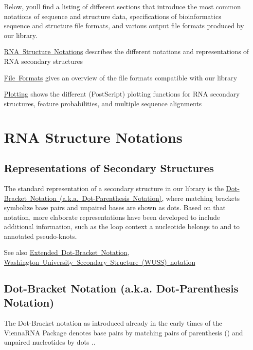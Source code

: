 Below, you\textquotesingle{}ll find a listing of different sections that introduce the most common notations of sequence and structure data, specifications of bioinformatics sequence and structure file formats, and various output file formats produced by our library.


\begin{DoxyItemize}
\item \mbox{\hyperlink{rna_structure_notations}{R\+NA Structure Notations}} describes the different notations and representations of R\+NA secondary structures
\item \mbox{\hyperlink{file_formats}{File Formats}} gives an overview of the file formats compatible with our library
\item \mbox{\hyperlink{plots}{Plotting}} shows the different (Post\+Script) plotting functions for R\+NA secondary structures, feature probabilities, and multiple sequence alignments 
\end{DoxyItemize}\hypertarget{rna_structure_notations}{}\section{R\+NA Structure Notations}\label{rna_structure_notations}
\hypertarget{rna_structure_notations_sec_structure_representations}{}\subsection{Representations of Secondary Structures}\label{rna_structure_notations_sec_structure_representations}
The standard representation of a secondary structure in our library is the \mbox{\hyperlink{rna_structure_notations_dot-bracket-notation}{Dot-\/\+Bracket Notation (a.\+k.\+a. Dot-\/\+Parenthesis Notation)}}, where matching brackets symbolize base pairs and unpaired bases are shown as dots. Based on that notation, more elaborate representations have been developed to include additional information, such as the loop context a nucleotide belongs to and to annotated pseudo-\/knots.

\begin{DoxySeeAlso}{See also}
\mbox{\hyperlink{rna_structure_notations_dot-bracket-ext-notation}{Extended Dot-\/\+Bracket Notation}}, \mbox{\hyperlink{rna_structure_notations_wuss-notation}{Washington University Secondary Structure (W\+U\+SS) notation}}
\end{DoxySeeAlso}
\hypertarget{rna_structure_notations_dot-bracket-notation}{}\subsection{Dot-\/\+Bracket Notation (a.\+k.\+a. Dot-\/\+Parenthesis Notation)}\label{rna_structure_notations_dot-bracket-notation}
The Dot-\/\+Bracket notation as introduced already in the early times of the Vienna\+R\+NA Package denotes base pairs by matching pairs of parenthesis {\ttfamily ()} and unpaired nucleotides by dots {\ttfamily .}.

